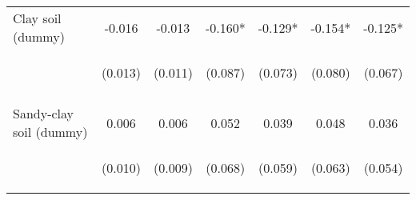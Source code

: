\begin{center}
\begin{tabular}{lcccccc}
Clay soil (dummy) & -0.016 & -0.013 & -0.160* & -0.129* & -0.154* & -0.125* \\
 & \begin{footnotesize}(0.013)\end{footnotesize} & \begin{footnotesize}(0.011)\end{footnotesize} & \begin{footnotesize}(0.087)\end{footnotesize} & \begin{footnotesize}(0.073)\end{footnotesize} & \begin{footnotesize}(0.080)\end{footnotesize} & \begin{footnotesize}(0.067)\end{footnotesize} \\
\vspace{4pt} & \begin{footnotesize}[0.203]\end{footnotesize} & \begin{footnotesize}[0.227]\end{footnotesize} & \begin{footnotesize}[0.066]\end{footnotesize} & \begin{footnotesize}[0.077]\end{footnotesize} & \begin{footnotesize}[0.055]\end{footnotesize} & \begin{footnotesize}[0.063]\end{footnotesize} \\
Sandy-clay soil (dummy) & 0.006 & 0.006 & 0.052 & 0.039 & 0.048 & 0.036 \\
 & \begin{footnotesize}(0.010)\end{footnotesize} & \begin{footnotesize}(0.009)\end{footnotesize} & \begin{footnotesize}(0.068)\end{footnotesize} & \begin{footnotesize}(0.059)\end{footnotesize} & \begin{footnotesize}(0.063)\end{footnotesize} & \begin{footnotesize}(0.054)\end{footnotesize} \\

\end{tabular}
\end{center}
